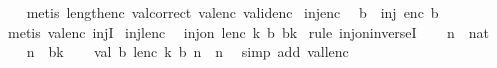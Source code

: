 \begin{isabellebody}
%
\isadelimproof
\ \ %
\endisadelimproof
%
\isatagproof
{}\isamarkupfalse%
\ {\isacharparenleft}{\kern0pt}metis\ length{\isacharunderscore}{\kern0pt}enc\ val{\isacharunderscore}{\kern0pt}correct\ val{\isacharunderscore}{\kern0pt}enc\ valid{\isacharunderscore}{\kern0pt}enc{\isacharparenright}{\kern0pt}%
\endisatagproof
{\isafoldproof}%
%
\isadelimproof
\isanewline
%
\endisadelimproof
\isanewline
{}\isamarkupfalse%
\ inj{\isacharunderscore}{\kern0pt}enc{\isacharcolon}{\kern0pt}\isanewline
\ \ {\isachardoublequoteopen}{}{\isasymle}b\ {\isasymLongrightarrow}\ inj\ {\isacharparenleft}{\kern0pt}enc\ b{\isacharparenright}{\kern0pt}{\isachardoublequoteclose}\isanewline
%
\isadelimproof
\ \ %
\endisadelimproof
%
\isatagproof
{}\isamarkupfalse%
\ {\isacharparenleft}{\kern0pt}metis\ val{\isacharunderscore}{\kern0pt}enc\ injI{\isacharparenright}{\kern0pt}%
\endisatagproof
{\isafoldproof}%
%
\isadelimproof
\isanewline
%
\endisadelimproof
\isanewline
{}\isamarkupfalse%
\ inj{\isacharunderscore}{\kern0pt}lenc{\isacharcolon}{\kern0pt}\isanewline
\ \ {\isachardoublequoteopen}inj{\isacharunderscore}{\kern0pt}on\ {\isacharparenleft}{\kern0pt}lenc\ k\ b{\isacharparenright}{\kern0pt}\ {\isacharbraceleft}{\kern0pt}{\isachardot}{\kern0pt}{\isachardot}{\kern0pt}{\isacharless}{\kern0pt}b{\isacharcircum}{\kern0pt}k{\isacharbraceright}{\kern0pt}{\isachardoublequoteclose}\isanewline
%
\isadelimproof
%
\endisadelimproof
%
\isatagproof
{}\isamarkupfalse%
\ {\isacharparenleft}{\kern0pt}rule\ inj{\isacharunderscore}{\kern0pt}on{\isacharunderscore}{\kern0pt}inverseI{\isacharparenright}{\kern0pt}\isanewline
\ \ \isamarkupfalse%
\ n\ {\isacharcolon}{\kern0pt}{\isacharcolon}{\kern0pt}\ nat\isanewline
\ \ \isamarkupfalse%
\ {\isachardoublequoteopen}n\ {\isasymin}\ {\isacharbraceleft}{\kern0pt}{\isachardot}{\kern0pt}{\isachardot}{\kern0pt}{\isacharless}{\kern0pt}b{\isacharcircum}{\kern0pt}k{\isacharbraceright}{\kern0pt}{\isachardoublequoteclose}\isanewline
\ \ \isamarkupfalse%
\ {\isachardoublequoteopen}val\ b\ {\isacharparenleft}{\kern0pt}lenc\ k\ b\ n{\isacharparenright}{\kern0pt}\ {\isacharequal}{\kern0pt}\ n{\isachardoublequoteclose}\ \isamarkupfalse%
\ {\isacharparenleft}{\kern0pt}simp\ add{\isacharcolon}{\kern0pt}\ val{\isacharunderscore}{\kern0pt}lenc{\isacharparenright}{\kern0pt}\isanewline
{}\isamarkupfalse%
%
\endisatagproof
{\isafoldproof}%
%
\isadelimproof
\isanewline
%
\endisadelimproof
\isanewline
{}\isamarkupfalse%

\end{isabellebody}
